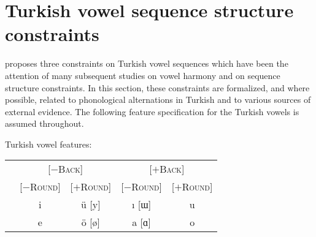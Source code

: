 \section{Turkish vowel sequence structure constraints}

\citet{Lees1966a,Lees1966b} proposes three constraints on Turkish vowel sequences 
which have been the attention of many subsequent studies on vowel harmony and on sequence structure constraints. In this section, these constraints are formalized, and where possible, related to phonological alternations in Turkish and to various sources of external evidence. The following feature specification for the Turkish vowels is assumed throughout. 

\begin{example}
Turkish vowel features:

\vspace{0.5\baselineskip}
\begin{tabular}{c | c c c c}
                       & \multicolumn{2}{c}{[$-$\textsc{Back}]} & \multicolumn{2}{c}{[$+$\textsc{Back}]} \\
                       & [$-$\textsc{Round}] & [$+$\textsc{Round}] & [$-$\textsc{Round}] & [$+$\textsc{Round}] \\ \midrule
{} & {i} & {ü} [y] & {ı} [ɯ] & {u} \\
 & {e} & {ö} [ø] & {a} [ɑ] & {o} \\
\end{tabular}
\end{example}




